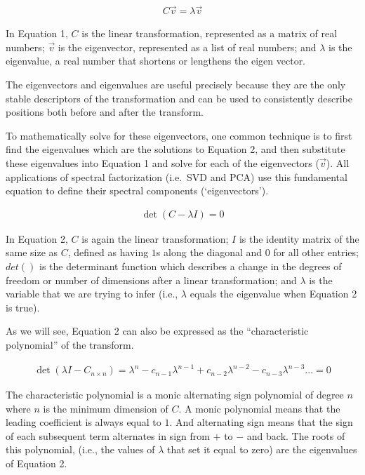 \documentclass[
  letterpaper,
  DIV=11,
  numbers=noendperiod]{scrartcl}
\begin{document}
\begin{align}
C\vec{v} = \lambda\vec{v}
\end{align}

In Equation 1, \(C\) is the linear transformation, represented as a
matrix of real numbers; \(\vec{v}\) is the eigenvector, represented as a
list of real numbers; and \(\lambda\) is the eigenvalue, a real number
that shortens or lengthens the eigen vector.

The eigenvectors and eigenvalues are useful precisely because they are
the only stable descriptors of the transformation and can be used to
consistently describe positions both before and after the transform.

To mathematically solve for these eigenvectors, one common technique is
to first find the eigenvalues which are the solutions to Equation 2, and
then substitute these eigenvalues into Equation 1 and solve for each of
the eigenvectors (\(\vec{v}\)). All applications of spectral
factorization (i.e.~SVD and PCA) use this fundamental equation to define
their spectral components (`eigenvectors').

\begin{align}
\det(C - \lambda I) = 0
\end{align}

In Equation 2, \(C\) is again the linear transformation; \(I\) is the
identity matrix of the same size as \(C\), defined as having \(1\)s
along the diagonal and \(0\) for all other entries; \(det()\) is the
determinant function which describes a change in the degrees of freedom
or number of dimensions after a linear transformation; and \(\lambda\)
is the variable that we are trying to infer (i.e., \(\lambda\) equals
the eigenvalue when Equation 2 is true).

As we will see, Equation 2 can also be expressed as the ``characteristic
polynomial'' of the transform.

\begin{align}
\det(\lambda I - C_{n\times n}) = \lambda^n - c_{n-1}\lambda^{n-1} + c_{n-2}\lambda^{n-2}  - c_{n-3}\lambda^{n-3}... = 0
\end{align}

The characteristic polynomial is a monic alternating sign polynomial of
degree \(n\) where \(n\) is the minimum dimension of \(C\). A monic
polynomial means that the leading coefficient is always equal to \(1\).
And alternating sign means that the sign of each subsequent term
alternates in sign from \(+\) to \(-\) and back. The roots of this
polynomial, (i.e., the values of \(\lambda\) that set it equal to zero)
are the eigenvalues of Equation 2.
\end{document}
